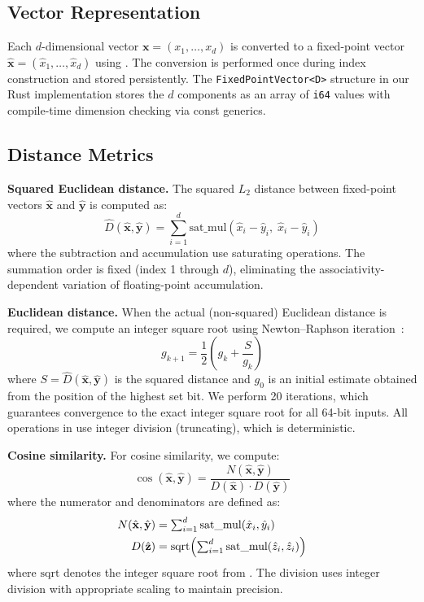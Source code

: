 \documentclass[10pt,journal]{IEEEtran}
\begin{document}
\subsection{Vector Representation}

Each $d$-dimensional vector $\mathbf{x} = (x_1, \ldots, x_d)$ is converted to a fixed-point vector $\hat{\mathbf{x}} = (\hat{x}_1, \ldots, \hat{x}_d)$ using . The conversion is performed once during index construction and stored persistently. The \texttt{FixedPointVector<D>} structure in our Rust implementation stores the $d$ components as an array of \texttt{i64} values with compile-time dimension checking via const generics.

\subsection{Distance Metrics}

\textbf{Squared Euclidean distance.} The squared $L_2$ distance between fixed-point vectors $\hat{\mathbf{x}}$ and $\hat{\mathbf{y}}$ is computed as:
\begin{equation}
  \label{eq:fp_l2}
  \hat{D}(\hat{\mathbf{x}}, \hat{\mathbf{y}}) = \sum_{i=1}^{d} \text{sat\_mul}(\hat{x}_i - \hat{y}_i,\; \hat{x}_i - \hat{y}_i)
\end{equation}
where the subtraction and accumulation use saturating operations. The summation order is fixed (index 1 through $d$), eliminating the associativity-dependent variation of floating-point accumulation.

\textbf{Euclidean distance.} When the actual (non-squared) Euclidean distance is required, we compute an integer square root using Newton--Raphson iteration~\cite{schoenmakers2023fixedpoint}:
\begin{equation}
  \label{eq:newton}
  g_{k+1} = \frac{1}{2}\left(g_k + \frac{S}{g_k}\right)
\end{equation}
where $S = \hat{D}(\hat{\mathbf{x}}, \hat{\mathbf{y}})$ is the squared distance and $g_0$ is an initial estimate obtained from the position of the highest set bit. We perform 20 iterations, which guarantees convergence to the exact integer square root for all 64-bit inputs. All operations in  use integer division (truncating), which is deterministic.

\textbf{Cosine similarity.} For cosine similarity, we compute:
\begin{equation}
  \cos(\hat{\mathbf{x}}, \hat{\mathbf{y}}) = \frac{N(\hat{\mathbf{x}}, \hat{\mathbf{y}})}{D(\hat{\mathbf{x}}) \cdot D(\hat{\mathbf{y}})}
\end{equation}
where the numerator and denominators are defined as:
\begin{align}
  N(\hat{\mathbf{x}}, \hat{\mathbf{y}}) &= \textstyle\sum_{i=1}^{d} \text{sat\_mul}(\hat{x}_i, \hat{y}_i) \notag\\
  D(\hat{\mathbf{z}}) &= \mathrm{sqrt}\!\left(\textstyle\sum_{i=1}^{d} \text{sat\_mul}(\hat{z}_i, \hat{z}_i)\right)
\end{align}
where $\mathrm{sqrt}$ denotes the integer square root from . The division uses integer division with appropriate scaling to maintain precision.
\end{document}
